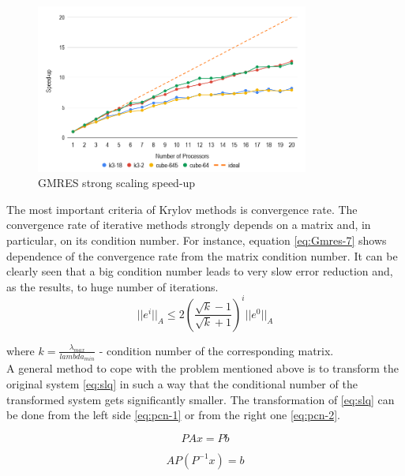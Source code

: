 \begin{figure}[htpb]
  \centering
  \includegraphics[width=0.8\textwidth]{figures/chapter-2/gmres-strong-scaling-speedup.png}
\caption{GMRES strong scaling speed-up}
\label{fig:gmres-strong-scaling-speed-up}
\end{figure}



The most important criteria of Krylov methods is convergence rate. The convergence rate of iterative methods strongly depends on a matrix and, in particular, on its condition number. For instance, equation \ref{eq:Gmres-7} shows dependence of the convergence rate from the matrix condition number. It can be clearly seen that a big condition number leads to very slow error reduction and, as the results, to huge number of iterations.\\

\begin{equation} \label{eq:Gmres-7}
	|| e^i ||_A \leq 2 ( \frac{\sqrt k - 1}{\sqrt k + 1} )^i || e^0 ||_A
\end{equation}

where $k = \frac{\lambda_{max}}{lambda_{min}}$ - condition number of the corresponding matrix. \\

A general method to cope with the problem mentioned above is to transform the original system \ref{eq:slq} in such a way that the conditional number of the transformed system gets significantly smaller. The transformation of \ref{eq:slq} can be done from the left side \ref{eq:pcn-1} or from the right one \ref{eq:pcn-2}.

\begin{equation} \label{eq:pcn-1}
	PAx = Pb
\end{equation}


\begin{equation} \label{eq:pcn-2}
	AP(P^{-1}x) = b
\end{equation}

